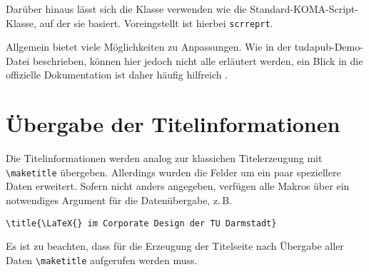 \documentclass[
	ngerman,
	ruledheaders=section,%
	class=report,%
	thesis={type=bachelor},%
	accentcolor=9c,%
	custommargins=true,%
	marginpar=false,%
	parskip=half-,%
	fontsize=11pt,%
]{tudapub}
\let\code\texttt
\begin{document}
Darüber hinaus lässt sich die Klasse verwenden wie die Standard-KOMA-Script-Klasse, auf der sie basiert.
Voreingstellt ist hierbei \code{scrreprt}.

Allgemein bietet \KOMAScript{} viele Möglichkeiten zu Anpassungen. Wie in der tudapub-Demo-Datei beschrieben, können hier jedoch nicht alle erläutert werden, ein Blick in die offizielle Dokumentation ist daher häufig hilfreich \cite{scrguide}.

\section{Übergabe der Titelinformationen}

Die Titelinformationen werden analog zur klassichen Titelerzeugung mit \verb+\maketitle+ übergeben. Allerdings wurden die Felder um ein paar speziellere Daten erweitert. Sofern nicht anders angegeben, verfügen alle Makros über ein notwendiges Argument für die Datenübergabe, z.\,B.
\begin{verbatim}
\title{\LaTeX{} im Corporate Design der TU Darmstadt}
\end{verbatim}
Es ist zu beachten, dass für die Erzeugung der Titelseite nach Übergabe aller Daten \verb+\maketitle+ aufgerufen werden muss.
\end{document}
